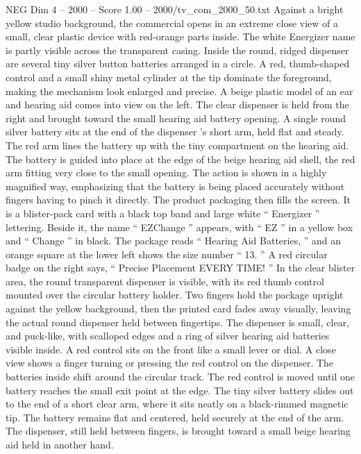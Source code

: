 \begin{textsample}{NEG Dim 4 – 2000 – Score 1.00 – 2000/tv\_com\_2000\_50.txt}  \label{ex:f4_neg_050}
Against a bright yellow studio background, the commercial opens in an extreme close view of a small, clear plastic device with red-orange parts inside.
The white Energizer name is partly visible across the transparent casing.
Inside the round, ridged dispenser are several tiny silver button batteries arranged in a circle.
A red, thumb-shaped control and a small shiny metal cylinder at the tip dominate the foreground, making the mechanism look enlarged and precise.
A beige plastic model of an ear and hearing aid comes into view on the left.
The clear dispenser is held from the right and brought toward the small hearing aid battery opening.
A single round silver battery sits at the end of the dispenser ’s short arm, held flat and steady.
The red arm lines the battery up with the tiny compartment on the hearing aid.
The battery is guided into place at the edge of the beige hearing aid shell, the red arm fitting very close to the small opening.
The action is shown in a highly magnified way, emphasizing that the battery is being placed accurately without fingers having to pinch it directly.
The product packaging then fills the screen.
It is a blister-pack card with a black top band and large white “ Energizer ” lettering.
Beside it, the name “ EZChange ” appears, with “ EZ ” in a yellow box and “ Change ” in black.
The package reads “ Hearing Aid Batteries, ” and an orange square at the lower left shows the size number “ 13. ” A red circular badge on the right says, “ Precise Placement EVERY TIME! ” In the clear blister area, the round transparent dispenser is visible, with its red thumb control mounted over the circular battery holder.
Two fingers hold the package upright against the yellow background, then the printed card fades away visually, leaving the actual round dispenser held between fingertips.
The dispenser is small, clear, and puck-like, with scalloped edges and a ring of silver hearing aid batteries visible inside.
A red control sits on the front like a small lever or dial.
A close view shows a finger turning or pressing the red control on the dispenser.
The batteries inside shift around the circular track.
The red control is moved until one battery reaches the small exit point at the edge.
The tiny silver battery slides out to the end of a short clear arm, where it sits neatly on a black-rimmed magnetic tip.
The battery remains flat and centered, held securely at the end of the arm.
The dispenser, still held between fingers, is brought toward a small beige hearing aid held in another hand.

\end{textsample}

